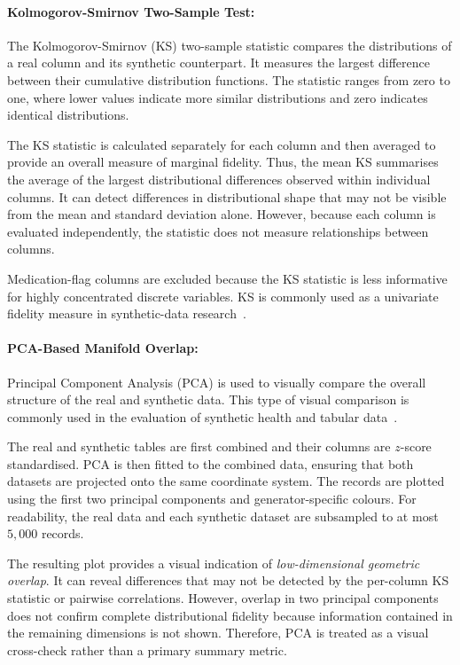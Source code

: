 \paragraph{Kolmogorov-Smirnov Two-Sample Test:}
\label{sec:eval:utility:similarity:ks}

The Kolmogorov-Smirnov (KS) two-sample statistic compares the
distributions of a real column and its synthetic counterpart. It measures
the largest difference between their cumulative distribution functions.
The statistic ranges from zero to one, where lower values indicate more
similar distributions and zero indicates identical
distributions.

The KS statistic is calculated separately for each column and then
averaged to provide an overall measure of marginal fidelity. Thus, the
mean KS summarises the average of the largest distributional differences
observed within individual columns. It can detect differences in
distributional shape that may not be visible from the mean and standard
deviation alone. However, because each column is evaluated independently,
the statistic does not measure relationships between columns.

Medication-flag columns are excluded because the KS statistic is less
informative for highly concentrated discrete variables. KS is commonly
used as a univariate fidelity measure in synthetic-data
research~\cite{Murtaza2023}.

\paragraph{PCA-Based Manifold Overlap:}
\label{sec:eval:utility:similarity:pca}

Principal Component Analysis (PCA) is used to visually compare the
overall structure of the real and synthetic data. This type of visual
comparison is commonly used in the evaluation of synthetic health and
tabular data~\cite{hernandez2022synthetic,Murtaza2023,lautrup2025syntheval}.

The real and synthetic tables are first combined and their columns are
$z$-score standardised. PCA is then fitted to the combined data, ensuring
that both datasets are projected onto the same coordinate system. The
records are plotted using the first two principal components and
generator-specific colours. For readability, the real data and each
synthetic dataset are subsampled to at most $5{,}000$ records.

The resulting plot provides a visual indication of
\emph{low-dimensional geometric overlap}. It can reveal differences that
may not be detected by the per-column KS statistic or pairwise
correlations. However, overlap in two principal components does not
confirm complete distributional fidelity because information contained
in the remaining dimensions is not shown. Therefore, PCA is treated as
a visual cross-check rather than a primary summary metric.

